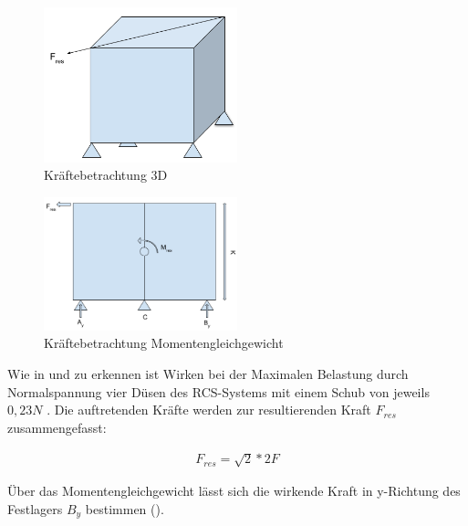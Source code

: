 \begin{figure}[!h]
	\centering
		\includegraphics[width=0.50\textwidth]{graphics/Gecko_Rechnung2.png}
	\caption{Kräftebetrachtung 3D}
	\label{fig:Gecko_Rechnung2}
\end{figure}

\begin{figure}[!h]
	\centering
		\includegraphics[width=0.50\textwidth]{graphics/Gecko_Rechnung3.png}
	\caption{Kräftebetrachtung Momentengleichgewicht}
	\label{fig:Gecko_Rechnung3}
\end{figure}


	Wie in  und  zu erkennen ist Wirken bei der Maximalen Belastung durch Normalspannung vier Düsen des RCS-Systems mit einem Schub von jeweils $0,23 N$ . Die auftretenden Kräfte werden zur resultierenden Kraft $F_{res}$  zusammengefasst:

	\begin{eqnarray}
			F_{res}=\sqrt{ 2 }*2F
	\end{eqnarray}

	Über das Momentengleichgewicht lässt sich die wirkende Kraft in y-Richtung des Festlagers $B_y$  bestimmen ().

